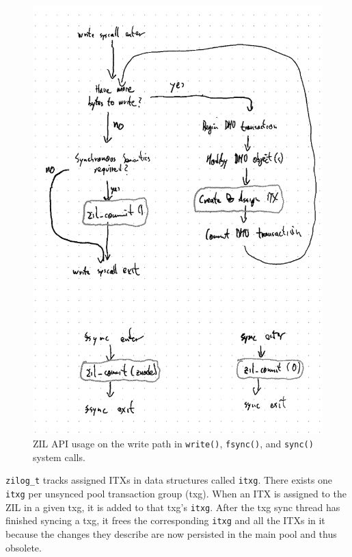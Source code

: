 \documentclass[12pt,a4paper,twoside]{book}
\begin{document}
\begin{figure}[h]
    \includegraphics[height=0.8\textheight]{fig/zil_api_syscall_activity_diagrams}
    \caption{
        ZIL API usage on the write path in \lstinline{write()}, \lstinline{fsync()}, and \lstinline{sync()} system calls.
    }
    \label{fig:zil_api_syscall_activity_diagrams}
\end{figure}

\lstinline{zilog_t} tracks assigned ITXs in data structures called \lstinline{itxg}.
There exists one \lstinline{itxg} per unsynced pool transaction group (txg).
When an ITX is assigned to the ZIL in a given txg, it is added to that txg's \lstinline{itxg}.
After the txg sync thread has finished syncing a txg, it frees the corresponding \lstinline{itxg} and all the ITXs in it because the changes they describe are now persisted in the main pool and thus obsolete.
\end{document}
